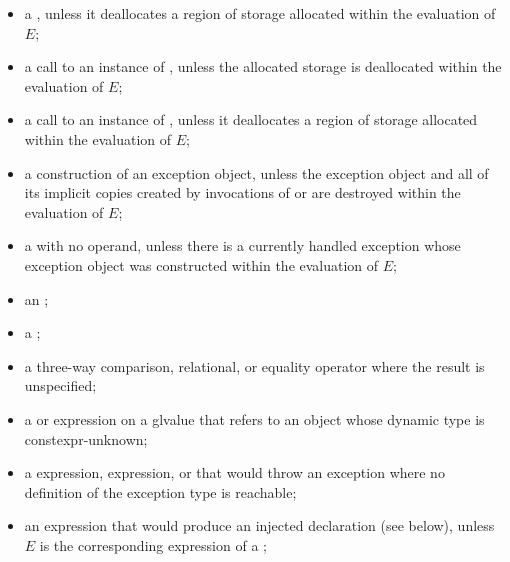 \begin{itemize}
\item
a ,
unless it deallocates a region of storage
allocated within the evaluation of $E$;

\item
a call to an instance of
,
unless the allocated storage is deallocated within the evaluation of $E$;

\item
a call to an instance of
,
unless it deallocates a region of storage
allocated within the evaluation of $E$;

\item
a construction of an exception object,
unless the exception object and
all of its implicit copies created by invocations of
 or 
are destroyed within the evaluation of $E$;

\item
a  with no operand,
unless there is a currently handled exception
whose exception object was constructed within the evaluation of $E$;

\item
an ;

\item
a ;

\item
a three-way comparison,
relational, or equality
operator where the result is unspecified;

\item
a  or
 expression
on a glvalue that refers to an object
whose dynamic type is constexpr-unknown;

\item
a  expression,
 expression, or
that would throw an exception
where no definition of the exception type is reachable;

\item
an expression that would produce an injected declaration (see below),
unless $E$ is the corresponding expression of
a ;


\end{itemize}
